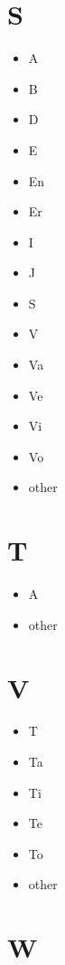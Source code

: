 \documentclass[
]{book}
\providecommand{\tightlist}{%
  \setlength{\itemsep}{0pt}\setlength{\parskip}{0pt}}
\begin{document}
\hypertarget{s}{%
\section{S}\label{s}}

\begin{itemize}
\tightlist
\item
  A
\item
  B
\item
  D
\item
  E
\item
  En
\item
  Er
\item
  I
\item
  J
\item
  S
\item
  V
\item
  Va
\item
  Ve
\item
  Vi
\item
  Vo
\item
  other
\end{itemize}

\hypertarget{t}{%
\section{T}\label{t}}

\begin{itemize}
\tightlist
\item
  A
\item
  other
\end{itemize}

\hypertarget{v}{%
\section{V}\label{v}}

\begin{itemize}
\tightlist
\item
  T
\item
  Ta
\item
  Ti
\item
  Te
\item
  To
\item
  other
\end{itemize}

\hypertarget{w}{%
\section{W}\label{w}}
\end{document}
